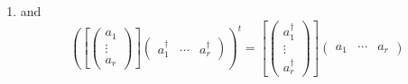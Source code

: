 \documentclass[aps,preprint]{revtex4}
\begin{document}
\begin{enumerate}
\begin{enumerate}
\begin{enumerate}
\item and 
\begin{equation}
\left( \left[ \left( 
\begin{array}{c}
a_{1} \\ 
\vdots \\ 
a_{r}%
\end{array}%
\right) \right] \left( 
\begin{array}{ccc}
a_{1}^{\dagger } & \cdots & a_{r}^{\dagger }%
\end{array}%
\right) \right) ^{t}=\left[ \left( 
\begin{array}{c}
a_{1}^{\dagger } \\ 
\vdots \\ 
a_{r}^{\dagger }%
\end{array}%
\right) \right] \left( 
\begin{array}{ccc}
a_{1} & \cdots & a_{r}%
\end{array}%
\right)
\end{equation}


\end{enumerate}
\end{enumerate}
\end{enumerate}
\end{document}
